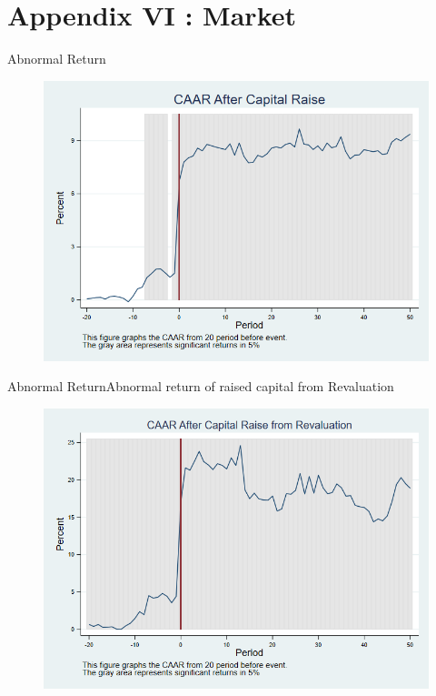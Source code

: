 \documentclass{beamer}
\begin{document}
\section{Appendix VI : Market}

\begin{frame}{Abnormal Return}
\label{car_market}
\begin{figure}
\centering
\includegraphics[width=0.7\linewidth]{Output/car_market.png}
\label{fig:car_market}
\end{figure}
\end{frame}

\begin{frame}{Abnormal Return}{Abnormal return of raised capital from Revaluation}
\label{car_marketRevaluation}
\begin{figure}
\centering
\includegraphics[width=0.65\linewidth]{Output/car_marketRevaluation}
\label{fig:car_marketRevaluation}
\end{figure}

\end{frame}
\end{document}
